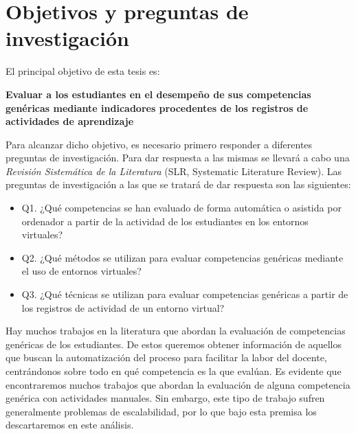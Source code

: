 
\section{Objetivos y preguntas de investigación}
\label{sec:objetivos}

El principal objetivo de esta tesis es:

\bigskip
\textbf{Evaluar a los estudiantes en el desempeño de sus competencias genéricas mediante indicadores procedentes de los registros de actividades de aprendizaje}
\bigskip

Para alcanzar dicho objetivo, es necesario primero responder a diferentes preguntas de investigación. Para dar respuesta a las mismas se llevará a cabo una \emph{Revisión Sistemática de la Literatura} (SLR, Systematic Literature Review). Las preguntas de investigación a las que se tratará de dar respuesta son las siguientes:

\begin{itemize}
\item Q1. ¿Qué competencias se han evaluado de forma automática o asistida por ordenador a partir de la actividad de los estudiantes en los entornos virtuales?
\item Q2. ¿Qué métodos se utilizan para evaluar competencias genéricas mediante el uso de entornos virtuales?
\item Q3. ¿Qué técnicas se utilizan para evaluar competencias genéricas a partir de los registros de actividad de un entorno virtual?
\end{itemize}

Hay muchos trabajos en la literatura que abordan la evaluación de competencias genéricas de los estudiantes. De estos queremos obtener información de aquellos que buscan la automatización del proceso para facilitar la labor del docente, centrándonos sobre todo en qué competencia es la que evalúan. Es evidente que encontraremos muchos trabajos que abordan la evaluación de alguna competencia genérica con actividades manuales. Sin embargo, este tipo de trabajo sufren generalmente problemas de escalabilidad, por lo que bajo esta premisa los descartaremos en este análisis.





